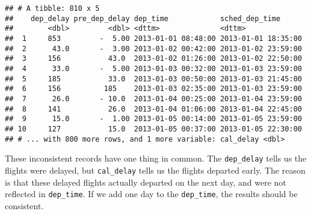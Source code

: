 \documentclass[]{article}
\newenvironment{Shaded}{\begin{snugshade}}{\end{snugshade}}
\newcommand{\KeywordTok}[1]{\textcolor[rgb]{0.13,0.29,0.53}{\textbf{#1}}}
\newcommand{\DataTypeTok}[1]{\textcolor[rgb]{0.13,0.29,0.53}{#1}}
\newcommand{\DecValTok}[1]{\textcolor[rgb]{0.00,0.00,0.81}{#1}}
\newcommand{\StringTok}[1]{\textcolor[rgb]{0.31,0.60,0.02}{#1}}
\newcommand{\OperatorTok}[1]{\textcolor[rgb]{0.81,0.36,0.00}{\textbf{#1}}}
\newcommand{\NormalTok}[1]{#1}
\theoremstyle{definition}
\theoremstyle{definition}
\theoremstyle{definition}
\theoremstyle{remark}
\begin{document}
\begin{verbatim}
## # A tibble: 810 x 5
##    dep_delay pre_dep_delay dep_time            sched_dep_time     
##        <dbl>         <dbl> <dttm>              <dttm>             
##  1     853         -  5.00 2013-01-01 08:48:00 2013-01-01 18:35:00
##  2      43.0       -  3.00 2013-01-02 00:42:00 2013-01-02 23:59:00
##  3     156           43.0  2013-01-02 01:26:00 2013-01-02 22:50:00
##  4      33.0       -  5.00 2013-01-03 00:32:00 2013-01-03 23:59:00
##  5     185           33.0  2013-01-03 00:50:00 2013-01-03 21:45:00
##  6     156          185    2013-01-03 02:35:00 2013-01-03 23:59:00
##  7      26.0       - 10.0  2013-01-04 00:25:00 2013-01-04 23:59:00
##  8     141           26.0  2013-01-04 01:06:00 2013-01-04 22:45:00
##  9      15.0       -  1.00 2013-01-05 00:14:00 2013-01-05 23:59:00
## 10     127           15.0  2013-01-05 00:37:00 2013-01-05 22:30:00
## # ... with 800 more rows, and 1 more variable: cal_delay <dbl>
\end{verbatim}

These inconsistent records have one thing in common. The
\texttt{dep\_delay} tells us the flights were delayed, but
\texttt{cal\_delay} tells us the flights departed early. The reason is
that these delayed flights actually departed on the next day, and were
not reflected in \texttt{dep\_time}. If we add one day to the
\texttt{dep\_time}, the results should be consistent.

\begin{Shaded}
\end{Shaded}
\end{document}
